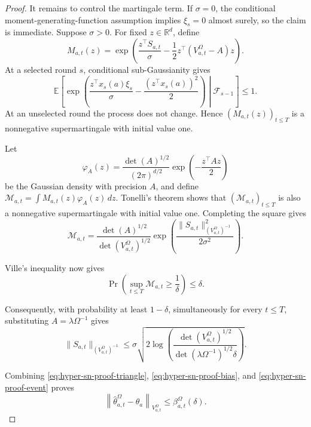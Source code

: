 \documentclass{article} %
\begin{document}
\begin{proof}
It remains to control the martingale term. If \(\sigma=0\), the conditional
moment-generating-function assumption implies \(\xi_s=0\) almost surely, so
the claim is immediate. Suppose \(\sigma>0\). For fixed
\(z\in\mathbb{R}^d\), define
\begin{equation}
\label{eq:hyper-sn-proof-mgf}
M_{a,t}(z)
=
\exp\!\left(
\frac{z^\top S_{a,t}}{\sigma}
-
\frac{1}{2}
z^\top
\left(V_{a,t}^{\Omega}-A\right)
z
\right).
\end{equation}
At a selected round \(s\), conditional sub-Gaussianity gives
\[
\mathbb E\!\left[
\exp\!\left(
\frac{z^\top x_s(a)\xi_s}{\sigma}
-\frac{(z^\top x_s(a))^2}{2}
\right)
\middle|\mathcal F_{s-1}
\right]
\le1.
\]
At an unselected round the process does not change. Hence
\((M_{a,t}(z))_{t\le T}\) is a nonnegative supermartingale with initial value
one.

Let
\[
\varphi_A(z)
=
\frac{\det(A)^{1/2}}{(2\pi)^{d/2}}
\exp\!\left(-\frac{z^\top A z}{2}\right)
\]
be the Gaussian density with precision \(A\), and define
\(\mathcal M_{a,t}=\int M_{a,t}(z)\varphi_A(z)\,dz\).
Tonelli's theorem shows that \((\mathcal M_{a,t})_{t\le T}\) is also a
nonnegative supermartingale with initial value one. Completing the square gives
\begin{equation}
\label{eq:hyper-sn-proof-mixture}
\mathcal M_{a,t}
=
\frac{\det(A)^{1/2}}{\det(V_{a,t}^{\Omega})^{1/2}}
\exp\!\left(
\frac{
\|S_{a,t}\|_{\left(V_{a,t}^{\Omega}\right)^{-1}}^2
}{2\sigma^2}
\right).
\end{equation}

Ville's inequality now gives
\begin{equation}
\label{eq:hyper-sn-proof-ville}
\Pr\!\left(
\sup_{t\le T}\mathcal M_{a,t}
\ge
\frac{1}{\delta}
\right)
\le
\delta .
\end{equation}

Consequently, with probability at least \(1-\delta\), simultaneously for every
\(t\le T\), substituting \(A=\lambda\Omega^{-1}\) gives
\begin{equation}
\label{eq:hyper-sn-proof-event}
\|S_{a,t}\|_{\left(V_{a,t}^{\Omega}\right)^{-1}}
\le
\sigma
\sqrt{
2\log
\left(
\frac{
\det(V_{a,t}^{\Omega})^{1/2}
}{
\det(\lambda\Omega^{-1})^{1/2}\delta
}
\right)
}.
\end{equation}

Combining \eqref{eq:hyper-sn-proof-triangle}, \eqref{eq:hyper-sn-proof-bias}, and \eqref{eq:hyper-sn-proof-event} proves
\begin{equation}
\label{eq:hyper-sn-proof-param}
\left\|
\widehat{\theta}_{a,t}^{\Omega}-\theta_a
\right\|_{V_{a,t}^{\Omega}}
\le
\beta_{a,t}^{\Omega}(\delta).
\end{equation}


\end{proof}
\end{document}
